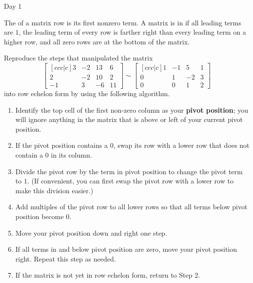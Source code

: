 \begin{applicationActivities}{Day 1}
\begin{definition}
  The  of a matrix row is its first nonzero term.
  A matrix is in  if all leading terms are \(1\),
  the leading term of every row
  is farther right than every leading term on a higher row, and all zero
  rows are at the bottom of the matrix.
\end{definition}

\begin{activity}
  Reproduce the steps that manipulated the matrix
  \[
    \begin{bmatrix}[ccc|c]
      3 & -2 & 13 & 6 \\
      2 & -2 & 10 & 2 \\
      -1 & 3 & -6 & 11
    \end{bmatrix}\sim
    \begin{bmatrix}[ccc|c]
      1 & -1 &  5 & 1 \\
      0 &  1 & -2 & 3 \\
      0 &  0 &  1 & 2
    \end{bmatrix}
  \]
  into row echelon form by using the following algorithm.
  \begin{multicols}{2}\noindent
  \begin{enumerate}
    \item Identify
    the top cell of the first non-zero column as your \textbf{pivot position};
    you will ignore anything in the matrix that is above or left of your
    current pivot position.
    \item If the pivot position contains a \(0\), swap its row with a lower
          row that does not contain a \(0\) in its column.
    \item Divide the pivot row by the term in pivot position to change the
          pivot term to \(1\). (If convenient, you can first swap the
          pivot row with a lower row to make this division easier.)
    \item Add multiples of the pivot row to all lower rows so that all terms
          below pivot position become \(0\).
    \item Move your pivot position down and right one step.
    \item If all terms in and below pivot position are zero, move your
          pivot position right. Repeat this step as needed.
    \item If the matrix is not yet in row echelon form, return to Step 2.
  \end{enumerate}
  \end{multicols}
\end{activity}


\end{applicationActivities}
